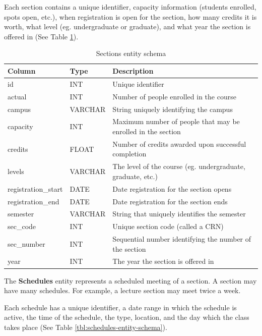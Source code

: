 \documentclass[12pt,letterpaper,oneside]{report}
\theoremstyle{definition}
\begin{document}
			Each section contains a unique identifier, capacity information (students enrolled, spots open, etc.), when registration is open for the section, how many credits it is worth, what level (eg. undergraduate or graduate), and what year the section is offered in (See Table \ref{tbl:sections-entity-schema}).
			
			\begin{table}[!htp]
				\centering
				\begin{tabular}{lll}
					\toprule
					Column & Type & Description \\
					\midrule
					id & INT & Unique identifier \\
					actual & INT & Number of people enrolled in the course \\
					campus & VARCHAR & String uniquely identifying the campus \\
					capacity & INT & Maximum number of people that may be enrolled in the section \\
					credits & FLOAT & Number of credits awarded upon successful completion \\
					levels & VARCHAR & The level of the course (eg. undergraduate, graduate, etc.) \\
					registration\_start & DATE & Date registration for the section opens \\
					registration\_end & DATE & Date registration for the section ends \\
					semester & VARCHAR & String that uniquely identifies the semester \\
					sec\_code & INT & Unique section code (called a CRN) \\
					sec\_number & INT & Sequential number identifying the number of the section \\
					year & INT & The year the section is offered in \\
					\bottomrule
				\end{tabular}
				\caption{Sections entity schema}
				\label{tbl:sections-entity-schema}
			\end{table}
			
			The \textbf{Schedules} entity represents a scheduled meeting of a section.  A section may have many schedules.  For example, a lecture section may meet twice a week.
			
			Each schedule has a unique identifier, a date range in which the schedule is active, the time of the schedule, the type, location, and the day which the class takes place (See Table \ref{tbl:schedules-entity-schema}).
			
\end{document}
